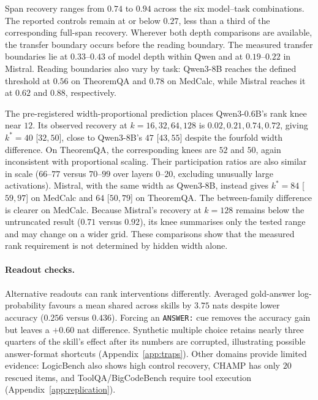 \documentclass{article}
\begin{document}
\begin{table}[t]
\caption{Replication with the corrected implementation. Injection layers are
$8$ for Qwen3-8B, $6$ for Qwen3-0.6B and $4$ for Mistral-7B. Recovery
intervals resample skill groups. Max control summarises the available
half-dose, other-skill, permutation and noise comparisons on the main subset.
Handover brackets the transfer boundary as a fraction of model depth; reading
is the first tested attention-knockout depth retaining at least half of rescued
items. $k^{*}$ is the rank knee on the fixed grid. ``--'' marks a measurement
not run after the fix.}
\label{tab:replication}
\centering
\footnotesize
\setlength{\tabcolsep}{4pt}

\end{table}

Span recovery ranges from $0.74$ to $0.94$ across the six model--task
combinations. The reported controls remain at or below $0.27$, less than a
third of the corresponding full-span recovery. Wherever both depth comparisons
are available, the transfer boundary occurs before the reading boundary.
The measured transfer boundaries lie at $0.33$--$0.43$ of model depth within
Qwen and at $0.19$--$0.22$ in Mistral. Reading boundaries also vary by task:
Qwen3-8B reaches the defined threshold at $0.56$ on TheoremQA and $0.78$ on
MedCalc, while Mistral reaches it at $0.62$ and $0.88$, respectively.

The pre-registered width-proportional prediction places Qwen3-0.6B's rank
knee near $12$. Its observed recovery at $k=16,32,64,128$ is
$0.02,0.21,0.74,0.72$, giving $k^{*}=40$ [$32,50$], close to Qwen3-8B's
$47$ [$43,55$] despite the fourfold width difference. On TheoremQA, the
corresponding knees are $52$ and $50$, again inconsistent with proportional
scaling. Their participation ratios are also similar in scale ($66$--$77$
versus $70$--$99$ over layers $0$--$20$, excluding unusually large
activations). Mistral, with the same width as Qwen3-8B, instead gives
$k^{*}=84$ [$59,97$] on MedCalc and $64$ [$50,79$] on TheoremQA. The
between-family difference is clearer on MedCalc. Because Mistral's recovery
at $k=128$ remains below the untruncated result ($0.71$ versus $0.92$), its
knee summarises only the tested range and may change on a wider grid.
These comparisons show that the measured rank requirement is not determined
by hidden width alone.

\paragraph{Readout checks.}
\label{sec:traps}
Alternative readouts can rank interventions differently. Averaged gold-answer
log-probability favours a mean shared across skills by $3.75$ nats despite
lower accuracy ($0.256$ versus $0.436$). Forcing an \texttt{ANSWER:} cue removes
the accuracy gain but leaves a $+0.60$ nat difference. Synthetic multiple
choice retains nearly three quarters of the skill's effect after its numbers
are corrupted, illustrating possible answer-format shortcuts
\citep{balepur2024artifacts} (Appendix~\ref{app:traps}). Other domains provide
limited evidence: LogicBench also shows high control recovery, CHAMP has only
$20$ rescued items, and ToolQA/BigCodeBench require tool execution
(Appendix~\ref{app:replication}).
\end{document}
